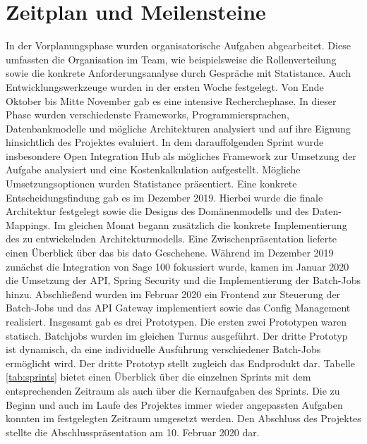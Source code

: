 \section{Zeitplan und Meilensteine}

In der Vorplanungsphase wurden organisatorische Aufgaben abgearbeitet. Diese umfassten die Organisation im Team, wie beispielsweise die Rollenverteilung sowie die konkrete Anforderungsanalyse durch Gespräche mit Statistance. Auch Entwicklungswerkzeuge wurden in der ersten Woche festgelegt. Von Ende Oktober bis Mitte November gab es eine intensive Recherchephase. In dieser Phase wurden verschiedenste Frameworks, Programmiersprachen, Datenbankmodelle und mögliche Architekturen analysiert und auf ihre Eignung hinsichtlich des Projektes evaluiert. In dem darauffolgenden Sprint wurde insbesondere Open Integration Hub als mögliches Framework zur Umsetzung der Aufgabe analysiert und eine Kostenkalkulation aufgestellt. Mögliche Umsetzungsoptionen wurden Statistance präsentiert. Eine konkrete Entscheidungsfindung gab es im Dezember 2019. Hierbei wurde die finale Architektur festgelegt sowie die Designs des Domänenmodells und des Daten-Mappings. Im gleichen Monat begann zusätzlich die konkrete Implementierung des zu entwickelnden Architekturmodells. Eine Zwischenpräsentation lieferte einen Überblick über das bis dato Geschehene. Während im Dezember 2019 zunächst die Integration von Sage 100 fokussiert wurde, kamen im Januar 2020 die Umsetzung der API, Spring Security und die Implementierung der Batch-Jobs hinzu. Abschließend wurden im Februar 2020 ein Frontend zur Steuerung der Batch-Jobs und das API Gateway implementiert sowie das Config Management realisiert. Insgesamt gab es drei Prototypen. Die ersten zwei Prototypen waren statisch. Batchjobs wurden im gleichen Turnus ausgeführt. Der dritte Prototyp ist dynamisch, da eine individuelle Ausführung verschiedener Batch-Jobs ermöglicht wird. Der dritte Prototyp stellt zugleich das Endprodukt dar. Tabelle \ref{tab:sprints} bietet einen Überblick über die einzelnen Sprints mit dem entsprechenden Zeitraum als auch über die Kernaufgaben des Sprints. Die zu Beginn und auch im Laufe des Projektes immer wieder angepassten Aufgaben konnten im festgelegten Zeitraum umgesetzt werden. Den Abschluss des Projektes stellte die Abschlusspräsentation am 10. Februar 2020 dar. 

